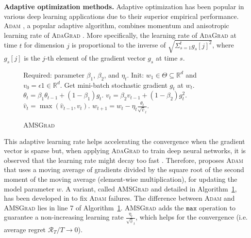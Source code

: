\documentclass[11pt]{article}
\theoremstyle{k}
\begin{document}
\textbf{Adaptive optimization methods.}\hspace{0.1cm}
Adaptive optimization has been popular in various deep learning applications due to their superior empirical performance.
\textsc{Adam} \citep{KB15}, a popular adaptive algorithm, combines momentum \citep{P64} and anisotropic learning rate of \textsc{AdaGrad} \citep{DHS11}.
More specifically, the learning rate of \textsc{AdaGrad} at time $t$ for dimension $j$ is proportional to the inverse of $\sqrt{ \Sigma_{s=1}^t g_s[j]^2 }$, where $g_s[j]$ is the $j$-th element of the gradient vector $g_s$ at time $s$.
\begin{figure}\vspace{-0.7cm}
\begin{minipage}{\linewidth}
\begin{algorithm}[H]
\caption{\textsc{AMSGrad} \citep{RKK18}} \label{alg:amsgrad}
\begin{algorithmic}[1]
\small
\STATE Required: parameter $\beta_1$, $\beta_2$, and $\eta_t$. 
\STATE Init: $w_{1} \in \Theta \subseteq \mathbb R^d $ and $v_{0} = \epsilon 1 \in \mathbb R^{d}$.
\STATE Get mini-batch stochastic gradient $g_t$ at $w_t$.
\STATE $\theta_t = \beta_1 \theta_{t-1} + (1 - \beta_1) g_t$.
\STATE $v_t = \beta_2 v_{t-1} + (1 - \beta_2) g_t^2$. 
\STATE $\hat{v}_t = \max( \hat{v}_{t-1} , v_t )$. 
\STATE $w_{t+1} = w_t - \eta_t \frac{\theta_t}{ \sqrt{\hat{v}}_t }$.
\ENDFOR
\end{algorithmic}
\end{algorithm}\vspace{.1cm}
\end{minipage}\end{figure}
This adaptive learning rate helps accelerating the convergence when the gradient vector is sparse \citep{DHS11} but, when applying \textsc{AdaGrad} to train deep neural networks, it is observed that the learning rate might decay too fast \citep{KB15}.
Therefore, \citep{KB15} proposes \textsc{Adam} that uses a moving average of gradients divided by the square root of the second moment of the moving average (element-wise multiplication), for updating the model parameter $w$.
A variant, called \textsc{AMSGrad} and detailed in Algorithm~\ref{alg:amsgrad}, has been developed in \citep{RKK18} to fix \textsc{Adam} failures.
The difference between \textsc{Adam} and \textsc{AMSGrad} lies in line 7 of Algorithm~\ref{alg:amsgrad}.
\textsc{AMSGrad} \citep{RKK18} adds the $\texttt{max}$ operation to guarantee a non-increasing learning rate $\frac{\eta_t }{ \sqrt{\hat{v}}_t }$, which helps for the convergence (i.e. average regret $\mathcal{R}_T/T \rightarrow 0$).
\vspace{-0.1in}
\end{document}

